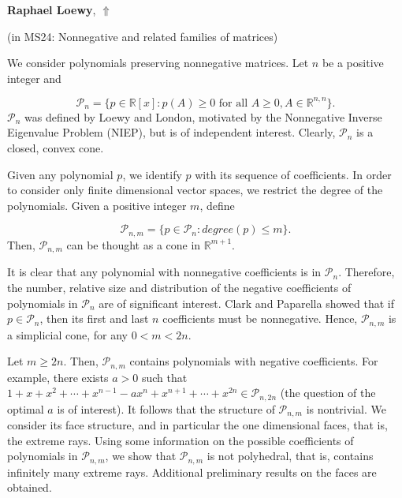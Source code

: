 \documentclass[ILAS2025-program.tex]{subfiles}
\begin{document}
\hypertarget{down0354}{}\begin{ilasabstract}
    
\textbf{Raphael Loewy},  \hfill \hyperlink{up0354}{$\Uparrow$}
    
    
(in {\color{mstitle}MS24: Nonnegative and related families of matrices})
        
\mtskip
    We consider polynomials preserving nonnegative matrices. Let $n$ be a positive integer and

\begin{equation*}
{\mathcal{P}}_{n}=\{p \in {{\mathbb{R}}}[x]: p(A)\geq 0 \text{ for all }  A \geq 0, A \in {\mathbb{R}}^{n,n}\}.
\end{equation*}
${\mathcal{P}}_{n}$ was defined by Loewy and London, motivated by the Nonnegative Inverse Eigenvalue Problem (NIEP), but is of independent interest. Clearly, ${\mathcal{P}}_{n}$ is a closed, convex cone.

\medskip
Given any polynomial $p$, we identify $p$ with its sequence of coefficients. In order to consider only finite dimensional vector spaces, we restrict the degree of the polynomials. Given a positive integer $m$, define

\begin{equation*}
{\mathcal{P}}_{n,m}=\{p \in {\mathcal{P}}_{n} : degree(p) \leq m \}.
\end{equation*}
Then, ${\mathcal{P}}_{n,m}$ can be thought as a cone in ${\mathbb{R}}^{m+1}$.

\medskip
It is clear that any polynomial with nonnegative coefficients is in ${\mathcal{P}}_{n}$. Therefore, the number, relative size and distribution of the negative coefficients of polynomials in ${\mathcal{P}}_{n}$ are of significant interest. Clark and Paparella showed that if $p \in {\mathcal{P}}_{n}$, then its first and last $n$ coefficients must be nonnegative. Hence, ${\mathcal{P}}_{n,m}$ is a simplicial cone, for any $0 < m <2n$.

\medskip
Let $m \geq 2n$. Then, ${\mathcal{P}}_{n,m}$ contains polynomials with negative coefficients. For example, there exists $a > 0$ such that $1+x+x^{2}+\cdots+x^{n-1}-ax^{n}+x^{n+1}+\cdots+x^{2n} \in {\mathcal{P}}_{n,2n}$ (the question of the optimal $a$ is of interest).
It follows that the structure of ${\mathcal{P}}_{n,m}$ is nontrivial. We consider its face structure, and in particular the one dimensional faces, that is, the extreme rays. Using some information on the possible coefficients of polynomials in  ${\mathcal{P}}_{n,m}$, we show that  ${\mathcal{P}}_{n,m}$ is not polyhedral, that is, contains infinitely many extreme rays. Additional preliminary results on the faces are obtained.
\end{ilasabstract}
    
\end{document}
